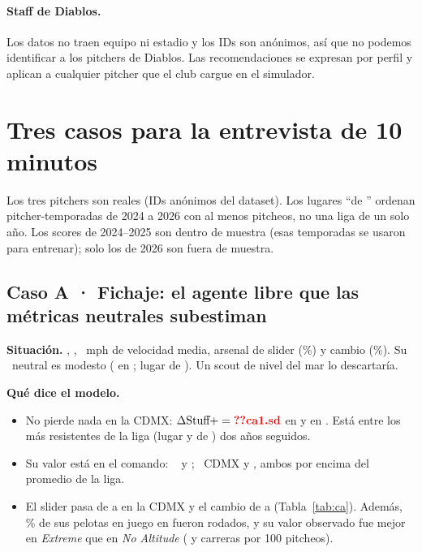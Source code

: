 \documentclass[10pt]{article}
\begin{document}
\paragraph{Staff de Diablos.} Los datos no traen equipo ni estadio y los IDs son anónimos, así que no podemos identificar a los pitchers de Diablos. Las recomendaciones se expresan por perfil y aplican a cualquier pitcher que el club cargue en el simulador.

\section{Tres casos para la entrevista de 10 minutos}

Los tres pitchers son reales (IDs anónimos del dataset). Los lugares ``de '' ordenan pitcher-temporadas de 2024 a 2026 con al menos  pitcheos, no una liga de un solo año. Los scores de 2024--2025 son dentro de muestra (esas temporadas se usaron para entrenar); solo los de 2026 son fuera de muestra.

\subsection*{Caso A · Fichaje: el agente libre que las métricas neutrales subestiman}

\textbf{Situación.} , , ~mph de velocidad media, arsenal de slider (\%) y cambio (\%). Su \splus\ neutral es modesto ( en ; lugar  de ). Un scout de nivel del mar lo descartaría.

\textbf{Qué dice el modelo.}
\begin{itemize}
  \item No pierde nada en la CDMX: $\Delta\splus = \cf{ca1.sd}$ en  y  en . Está entre los más resistentes de la liga (lugar  y  de ) dos años seguidos.
  \item Su valor está en el comando: \lplus\  y ; \pplus\ CDMX  y , ambos por encima del promedio de la liga.
  \item El slider pasa de  a  en la CDMX y el cambio de  a  (Tabla~\ref{tab:ca}). Además, \% de sus pelotas en juego en  fueron rodados, y su valor observado fue mejor en \emph{Extreme} que en \emph{No Altitude} ( y  carreras por 100 pitcheos).
\end{itemize}
\end{document}
